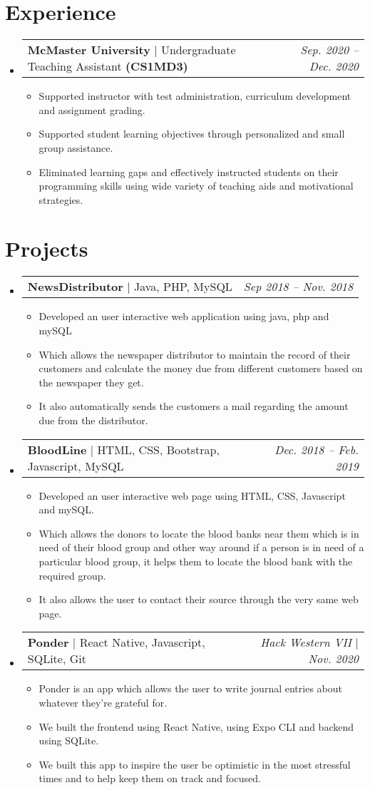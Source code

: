 \documentclass[letterpaper,11pt]{article}
\makeatletter
\newcommand{\resumeItem}[1]{
  \item\small{
    {#1 \vspace{-2pt}}
  }
}
\newcommand{\resumeSubheading}[2]{
  \vspace{-2pt}\item
    \begin{tabular*}{0.97\textwidth}[t]{l@{\extracolsep{\fill}}r}
      #1 & #2 \\
    \end{tabular*}\vspace{-7pt}
}
\newcommand{\resumeProjectHeading}[2]{
    \item
    \begin{tabular*}{0.97\textwidth}{l@{\extracolsep{\fill}}r}
      \small#1 & #2 \\
    \end{tabular*}\vspace{-7pt}
}
\newcommand{\resumeSubHeadingListStart}{\begin{itemize}[leftmargin=0.15in, label={}]}
\newcommand{\resumeSubHeadingListEnd}{\end{itemize}}
\newcommand{\resumeItemListStart}{\begin{itemize}}
\newcommand{\resumeItemListEnd}{\end{itemize}\vspace{-5pt}}
\makeatother
\begin{document}
\section{Experience}
  \resumeSubHeadingListStart
    \resumeSubheading
      {\textbf{McMaster University} $|$ \small Undergraduate Teaching Assistant \textbf{(CS1MD3)}}{\textit{\small Sep. 2020 -- Dec. 2020}}
      \resumeItemListStart
        \resumeItem{Supported instructor with test administration, curriculum development and assignment grading.}
        \resumeItem{Supported student learning objectives through personalized and small group assistance.}
        \resumeItem{Eliminated learning gaps and effectively instructed students on their programming skills using wide variety of teaching aids and motivational strategies.}
      \resumeItemListEnd
  \resumeSubHeadingListEnd

\section{Projects}
    \resumeSubHeadingListStart
      \resumeProjectHeading
          {\textbf{NewsDistributor} $|$ \small{Java, PHP, MySQL}}{\small \textit{Sep 2018 -- Nov. 2018}}
          \resumeItemListStart
            \resumeItem{Developed an user interactive web application using java, php and mySQL}
            \resumeItem{Which allows the newspaper distributor to maintain the record of their customers and calculate the money due from different customers based on the newspaper they get.}
            \resumeItem{It also automatically sends the customers a mail regarding the amount due from the distributor.}
          \resumeItemListEnd
      \resumeProjectHeading
          {\textbf{BloodLine} $|$ \small{HTML, CSS, Bootstrap, Javascript, MySQL}}{\small \textit{Dec. 2018 -- Feb. 2019}}
          \resumeItemListStart
            \resumeItem{Developed an user interactive web page using HTML, CSS, Javascript and mySQL.}
            \resumeItem{Which allows the donors to locate the blood banks near them which is in need of their blood group and other way around if a person is in need of a particular blood group, it helps them to locate the blood bank with the required group.}
            \resumeItem{It also allows the user to contact their source through the very same web page.}
          \resumeItemListEnd
      \resumeProjectHeading
          {\textbf{Ponder} $|$ \small{React Native, Javascript, SQLite, Git}}{\small \textit{Hack Western VII $|$ Nov. 2020}}
          \resumeItemListStart
            \resumeItem{Ponder is an app which allows the user to write journal entries about whatever they're grateful for.}
            \resumeItem{We built the frontend using React Native, using Expo CLI and backend using SQLite.}
            \resumeItem{We built this app to inspire the user be optimistic in the most stressful times and to help keep them on track and focused.}
          \resumeItemListEnd
    \resumeSubHeadingListEnd
\end{document}
